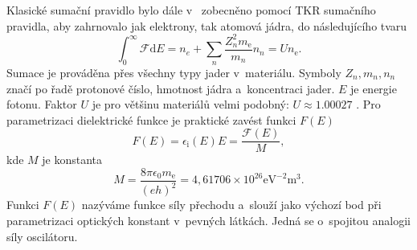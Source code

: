 Klasické sumační pravidlo bylo dále v~\cite{sumrule} zobecněno pomocí TKR sumačního pra\-vid\-la, aby zahrnovalo jak elektrony, tak atomová jádra, do následujícího tvaru
\begin{equation}
\int_0^\infty \mathcal{F} \mathrm{d}E = n_e + \sum_n \frac{Z_n^2 m_\mathrm{e}} {m_n} n_n = U n_\mathrm{e} \mathrm{.}
\label{density}
\end{equation}
Sumace je prováděna přes všechny typy jader v~materiálu. Symboly $Z_n, m_n, n_n$ značí po řadě protonové číslo, hmotnost jádra a~koncentraci jader. $E$ je energie fotonu. Faktor $U$ je pro většinu materiálů velmi podobný: $U \approx 1.00027$ \cite{sumrule}.
%
Pro parametrizaci dielektrické funkce je praktické zavést funkci $F(E)$
\begin{equation}
F(E) = \epsilon_\mathrm{i}(E) E = \frac{\mathcal{F}(E)}{M}\mathrm{,}
\end{equation}  
kde $M$ je konstanta
\begin{equation} 
M = \frac{8 \pi \epsilon_0 m_\mathrm{e}}{(e h)^2} = 4,61706\times10^{26} \mathrm{eV}^{-2}\mathrm{m}^3 \mathrm{.}
\end{equation}
%
Funkci $F(E)$ nazýváme funkce síly přechodu a~slouží jako výchozí bod při parametrizaci optických konstant v~pevných látkách. Jedná se o~spojitou analogii síly oscilátoru.

